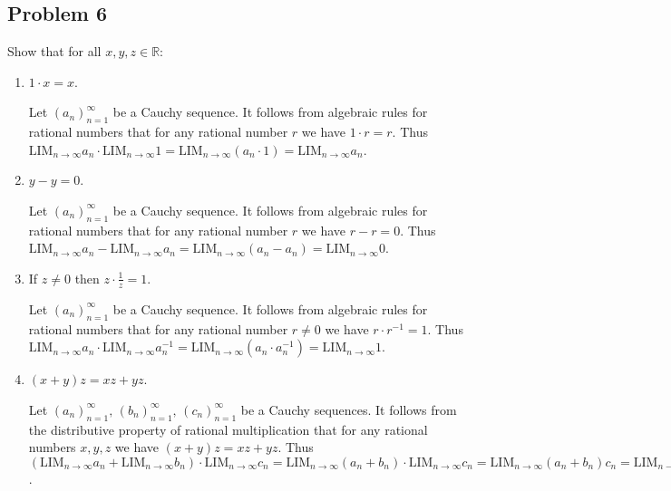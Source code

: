 \documentclass{article}
\theoremstyle{plain}
\theoremstyle{definition}
\begin{document}
\subsection*{Problem 6}
Show that for all \(x,y,z\in\mathbb{R}\):
\begin{enumerate}
	\item \(1\cdot x=x\).
		\begin{IEEEproof}
			Let \((a_n)_{n=1}^\infty\) be a Cauchy sequence. It follows from algebraic rules for rational numbers that for any rational number \(r\) we have \(1\cdot r=r\). Thus \(\text{LIM}_{n\rightarrow\infty}a_n\cdot\text{LIM}_{n\rightarrow\infty}1=\text{LIM}_{n\rightarrow\infty}(a_n\cdot 1)=\text{LIM}_{n\rightarrow\infty}a_n\).
		\end{IEEEproof}
	\item \(y-y=0\).
		\begin{IEEEproof}
			Let \((a_n)_{n=1}^{\infty}\) be a Cauchy sequence. It follows from algebraic rules for rational numbers that for any rational number \(r\) we have \(r-r=0\). Thus \(\text{LIM}_{n\rightarrow\infty}a_n-\text{LIM}_{n\rightarrow\infty}a_n=\text{LIM}_{n\rightarrow\infty}(a_n-a_n)=\text{LIM}_{n\rightarrow\infty}0\).
		\end{IEEEproof}
	\item If \(z\neq 0\) then \(z\cdot\frac{1}{z}=1\).
		\begin{IEEEproof}
			Let \((a_n)_{n=1}^{\infty}\) be a Cauchy sequence. It follows from algebraic rules for rational numbers that for any rational number \(r\neq 0\) we have \(r\cdot r^{-1}=1\). Thus \(\text{LIM}_{n\rightarrow\infty}a_n\cdot\text{LIM}_{n\rightarrow\infty}a_n^{-1}=\text{LIM}_{n\rightarrow\infty}(a_n\cdot a_n^{-1})=\text{LIM}_{n\rightarrow\infty}1\).
		\end{IEEEproof}
	\item \((x+y)z=xz+yz\).
		\begin{IEEEproof}
			Let \((a_n)_{n=1}^{\infty},\,(b_n)_{n=1}^{\infty},\,(c_n)_{n=1}^{\infty}\) be a Cauchy sequences. It follows from the distributive property of rational multiplication that for any rational numbers \(x,y,z\) we have \((x+y)z=xz+yz\). Thus \((\text{LIM}_{n\rightarrow\infty}a_n+\text{LIM}_{n\rightarrow\infty}b_n)\cdot\text{LIM}_{n\rightarrow\infty}c_n=\text{LIM}_{n\rightarrow\infty}(a_n+b_n)\cdot\text{LIM}_{n\rightarrow\infty}c_n=\text{LIM}_{n\rightarrow\infty}(a_n+b_n)c_n=\text{LIM}_{n\rightarrow\infty}(a_nc_n+b_nc_n)=\text{LIM}_{n\rightarrow\infty}a_nc_n+\text{LIM}_{n\rightarrow\infty}b_nc_n\).
		\end{IEEEproof}
\end{enumerate}
\end{document}
